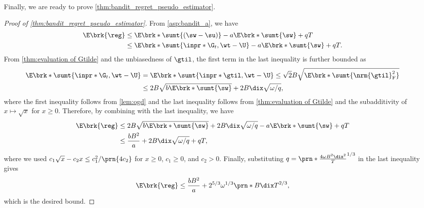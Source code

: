 Finally, we are ready to prove \cref{thm:bandit_regret_pseudo_estimator}.
\begin{proof}[Proof of \cref{thm:bandit_regret_pseudo_estimator}]
    From \cref{asp:bandit_a}, we have 
    \begin{align*}\label{eq:inverse_reg_expect}
        \E\brk{\reg}
        &\leq\E\brk*{\sumt{(\sw-\su)}}-a\E\brk*{\sumt{\sw}}+qT
        \nonumber \\
        &\leq\E\brk*{\sumt{\inpr*{\G_t,\wt-\U}}}-a\E\brk*{\sumt{\sw}}+qT.
    \end{align*}
    From \cref{thm:evaluation of Gtilde} and the unbiasedness of $\gtil$, 
    the first term in the last inequality is further bounded as
    \begin{align*}
        \E\brk*{\sumt{\inpr*{\G_t,\wt-\U}}}  
        &=\E\brk*{\sumt{\inpr*{\gtil,\wt-\U}}}
        \leq\sqrt{2}B\sqrt{\E\brk*{\sumt{\nrm{\gtil}_{\mathrm{F}}^2}}}
        \nonumber \\
        &\leq
        2 B \sqrt{b\E\brk*{\sumt{\sw}}}
        +
        2 B \dix \sqrt{ \omega / q},
    \end{align*}
    where 
    the first inequality follows from \cref{lem:ogd} and the last inequality follows from \cref{thm:evaluation of Gtilde} and the subadditivity of $x \mapsto \sqrt{x}$ for $x \geq 0$.
    Therefore, by combining  with the last inequality, we have 
    \begin{align}
        \E\brk{\reg}
        &\leq 
        2B \sqrt{b\E\brk*{\sumt{\sw}}} 
        +
        2 B \dix \sqrt{ \omega / q} 
        -a \E\brk*{\sumt{\sw}} + qT \\ 
        &\leq 
        \frac{bB^2}{a}
        +
        2 B \dix \sqrt{ \omega / q} 
        +qT ,
        \nonumber
    \end{align}
    where we used $c_1\sqrt{x}-c_2x\leq{c_1^2}/\prn{4c_2}$ for $x\geq0$, $c_1\geq 0$, and $c_2>0$.
    Finally, substituting 
    $q=\prn*{\frac{4 \omega B^2\dix ^2}{ T }}^{1/3}$ in the last inequality gives
    \[
    \E\brk{\reg}
    \leq
    \frac{bB^2}{a}
    +
    2^{5/3} \omega^{1/3} \prn*{ B \dix T}^{2/3}
    ,
    \]
    which is the desired bound.
\end{proof}



